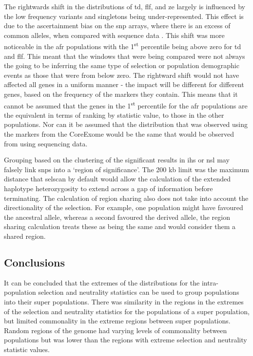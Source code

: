 \documentclass[twoside,openright]{report}
\begin{document}
The rightwards shift in the distributions of \gls{td}, \gls{flf}, and
\gls{ze} largely is influenced by the low frequency variants and
singletons being under-represented. This effect is due to the
ascertainment bias on the \gls{snp} arrays, where there is an excess of
common alleles, when compared with sequence data
\citep{Ramirez-Soriano2009}. This shift was more noticeable in the
\gls{afr} populations with the 1\textsuperscript{st} percentile being
above zero for \gls{td} and \gls{flf}. This meant that the windows that
were being compared were not always the going to be inferring the same
type of selection or population demographic events as those that were
from below zero. The rightward shift would not have affected all genes
in a uniform manner - the impact will be different for different genes,
based on the frequency of the markers they contain. This means that it
cannot be assumed that the genes in the 1\textsuperscript{st} percentile
for the \gls{afr} populations are the equivalent in terms of ranking by
statistic value, to those in the other populations. Nor can it be
assumed that the distribution that was observed using the markers from
the CoreExome would be the same that would be observed from using
sequencing data.

Grouping based on the clustering of the significant results in \gls{ihs}
or \gls{nsl} may falsely link \glspl{snp} into a `region of
significance'. The 200 kb limit was the maximum distance that selscan by
default would allow the calculation of the extended haplotype
heterozygosity to extend across a gap of information before terminating.
The calculation of region sharing also does not take into account the
directionality of the selection. For example, one population might have
favoured the ancestral allele, whereas a second favoured the derived
allele, the region sharing calculation treats these as being the same
and would consider them a shared region.

\subsection{Conclusions}\label{conclusions}

It can be concluded that the extremes of the distributions for the
intra-population selection and neutrality statistics can be used to
group populations into their super populations. There was similarity in
the regions in the extremes of the selection and neutrality statistics
for the populations of a super population, but limited commonality in
the extreme regions between super populations. Random regions of the
genome had varying levels of commonality between populations but was
lower than the regions with extreme selection and neutrality statistic
values.
\end{document}
